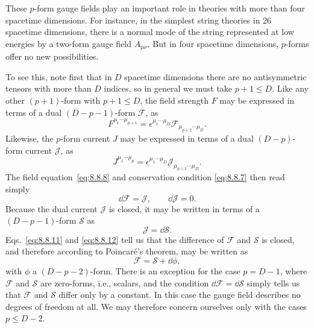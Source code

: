 These $p$-form gauge fields play an important role in theories with more than
four spacetime dimensions. For instance, in the simplest string theories in
26 spacetime dimensions, there is a normal mode of the string represented at
low energies by a two-form gauge field $A_{\mu\nu}$. But in four spacetime
dimensions, $p$-forms offer no new possibilities.

To see this, note first that in $D$ spacetime dimensions there are no
antisymmetric tensors with more than $D$ indices, so in general we must take
$p+1\leq D$. Like any other $(p+1)$-form with $p+1\leq D$, the field
strength $F$ may be expressed in terms of a dual $(D-p-1)$-form
$\mathcal F$, as
\begin{equation}
F^{\mu_1\cdots\mu_{p+1}}
=\epsilon^{\mu_1\cdots\mu_D}
\mathcal F_{\mu_{p+2}\cdots\mu_D}.
\tag{8.8.9}\label{eq:8.8.9}
\end{equation}
Likewise, the $p$-form current $J$ may be expressed in terms of a dual
$(D-p)$-form current $\mathcal J$, as
\begin{equation}
J^{\mu_1\cdots\mu_p}
=\epsilon^{\mu_1\cdots\mu_D}\mathcal J_{\mu_{p+1}\cdots\mu_D}.
\tag{8.8.10}\label{eq:8.8.10}
\end{equation}
The field equation~\eqref{eq:8.8.8} and conservation condition \eqref{eq:8.8.7} then read
simply
\begin{equation}
\dd\mathcal F=\mathcal J,\qquad \dd\mathcal J=0.
\tag{8.8.11}\label{eq:8.8.11}
\end{equation}
Because the dual current $\mathcal J$ is closed, it may be written in terms
of a $(D-p-1)$-form $\mathcal S$ as
\begin{equation}
\mathcal J=\dd\mathcal S.
\tag{8.8.12}\label{eq:8.8.12}
\end{equation}
Eqs.~\eqref{eq:8.8.11} and \eqref{eq:8.8.12} tell us that the difference of $\mathcal F$ and
$\mathcal S$ is closed, and therefore according to Poincaré's theorem, may be
written as
\begin{equation}
\mathcal F=\mathcal S+\dd\phi,
\tag{8.8.13}\label{eq:8.8.13}
\end{equation}
with $\phi$ a $(D-p-2)$-form. There is an exception for the case $p=D-1$,
where $\mathcal F$ and $\mathcal S$ are zero-forms, i.e., scalars, and the
condition $\dd\mathcal F=\dd\mathcal S$ simply tells us that $\mathcal F$ and
$\mathcal S$ differ only by a constant. In this case the gauge field describes
no degrees of freedom at all. We may therefore concern ourselves only with
the cases $p\leq D-2$.

